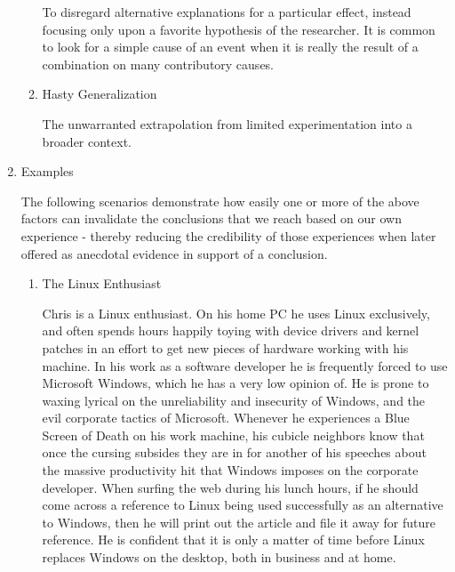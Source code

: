 \documentclass{article}
\begin{document}
\begin{enumerate}
\begin{enumerate}
To disregard alternative explanations for a particular effect, instead
focusing only upon a favorite hypothesis of the researcher. It is common
to look for a simple cause of an event when it is really the result of a
combination on many contributory causes.

\item Hasty Generalization
\label{sec:orgheadline372}

The unwarranted extrapolation from limited experimentation into a
broader context.
\end{enumerate}

\item Examples
\label{sec:orgheadline377}

The following scenarios demonstrate how easily one or more of the above
factors can invalidate the conclusions that we reach based on our own
experience - thereby reducing the credibility of those experiences when
later offered as anecdotal evidence in support of a conclusion.

\begin{enumerate}
\item The Linux Enthusiast
\label{sec:orgheadline374}

Chris is a Linux enthusiast. On his home PC he uses Linux exclusively,
and often spends hours happily toying with device drivers and kernel
patches in an effort to get new pieces of hardware working with his
machine. In his work as a software developer he is frequently forced to
use Microsoft Windows, which he has a very low opinion of. He is prone
to waxing lyrical on the unreliability and insecurity of Windows, and
the evil corporate tactics of Microsoft. Whenever he experiences a Blue
Screen of Death on his work machine, his cubicle neighbors know that
once the cursing subsides they are in for another of his speeches about
the massive productivity hit that Windows imposes on the corporate
developer. When surfing the web during his lunch hours, if he should
come across a reference to Linux being used successfully as an
alternative to Windows, then he will print out the article and file it
away for future reference. He is confident that it is only a matter of
time before Linux replaces Windows on the desktop, both in business and
at home.


\end{enumerate}
\end{enumerate}
\end{document}
